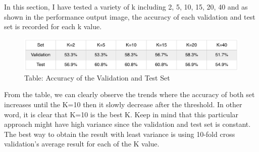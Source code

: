 \documentclass[12pt]{article} %
\begin{document}
In this section, I have tested a variety of k including 2, 5, 10, 15, 20, 40 and as shown in the performance output image, the accuracy of each validation and test set is recorded for each k value. 

\begin{figure}[H] %
  \centering 
  \begin{minipage}[b]{0.7\textwidth}
    \includegraphics[width=\textwidth]{part3_0}
    \caption{Table: Accuracy of the Validation and Test Set}
  \end{minipage}
\end{figure}

From the table, we can clearly observe the trends where the accuracy of both set increases until the K=10 then it slowly decrease after the threshold. In other word, it is clear that K=10 is the best K. Keep in mind that this particular approach might have high variance since the validation and test set is constant. The best way to obtain the result with least variance is using 10-fold cross validation’s average result for each of the K value. 
\end{document}
